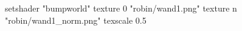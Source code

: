setshader "bumpworld"
   texture 0 "robin/wand1.png"
   texture n "robin/wand1_norm.png"
texscale 0.5